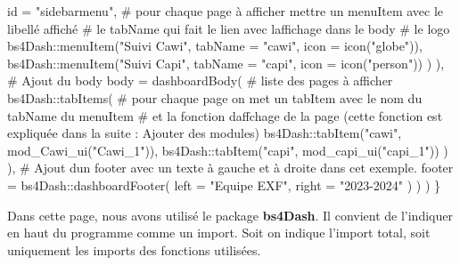 \documentclass[
  letterpaper,
  DIV=11,
  numbers=noendperiod]{scrreprt}
\newenvironment{Shaded}{\begin{snugshade}}{\end{snugshade}}
\newcommand{\AttributeTok}[1]{\textcolor[rgb]{0.40,0.45,0.13}{#1}}
\newcommand{\CommentTok}[1]{\textcolor[rgb]{0.37,0.37,0.37}{#1}}
\newcommand{\FunctionTok}[1]{\textcolor[rgb]{0.28,0.35,0.67}{#1}}
\newcommand{\NormalTok}[1]{\textcolor[rgb]{0.00,0.23,0.31}{#1}}
\newcommand{\SpecialCharTok}[1]{\textcolor[rgb]{0.37,0.37,0.37}{#1}}
\newcommand{\StringTok}[1]{\textcolor[rgb]{0.13,0.47,0.30}{#1}}
\begin{document}
\begin{Shaded}
\begin{Highlighting}[]
          \AttributeTok{id =} \StringTok{"sidebarmenu"}\NormalTok{,}
          \CommentTok{\# pour chaque page à afficher mettre un menuItem avec le libellé affiché}
          \CommentTok{\# le tabName qui fait le lien avec l\textquotesingle{}affichage dans le body}
          \CommentTok{\# le logo}
\NormalTok{          bs4Dash}\SpecialCharTok{::}\FunctionTok{menuItem}\NormalTok{(}\StringTok{"Suivi Cawi"}\NormalTok{, }\AttributeTok{tabName =} \StringTok{"cawi"}\NormalTok{, }\AttributeTok{icon =} \FunctionTok{icon}\NormalTok{(}\StringTok{"globe"}\NormalTok{)),}
\NormalTok{          bs4Dash}\SpecialCharTok{::}\FunctionTok{menuItem}\NormalTok{(}\StringTok{"Suivi Capi"}\NormalTok{, }\AttributeTok{tabName =} \StringTok{"capi"}\NormalTok{, }\AttributeTok{icon =} \FunctionTok{icon}\NormalTok{(}\StringTok{"person"}\NormalTok{))}
\NormalTok{        )}
\NormalTok{      ),}
      \CommentTok{\# Ajout du body}
      \AttributeTok{body =} \FunctionTok{dashboardBody}\NormalTok{(}
        \CommentTok{\# liste des pages à afficher}
\NormalTok{        bs4Dash}\SpecialCharTok{::}\FunctionTok{tabItems}\NormalTok{(}
          \CommentTok{\# pour chaque page on met un tabItem avec le nom du tabName du menuItem}
          \CommentTok{\# et la fonction d\textquotesingle{}affchage de la page (cette fonction est expliquée dans la suite : Ajouter des modules)}
\NormalTok{          bs4Dash}\SpecialCharTok{::}\FunctionTok{tabItem}\NormalTok{(}\StringTok{"cawi"}\NormalTok{, }\FunctionTok{mod\_Cawi\_ui}\NormalTok{(}\StringTok{"Cawi\_1"}\NormalTok{)),}
\NormalTok{          bs4Dash}\SpecialCharTok{::}\FunctionTok{tabItem}\NormalTok{(}\StringTok{"capi"}\NormalTok{, }\FunctionTok{mod\_capi\_ui}\NormalTok{(}\StringTok{"capi\_1"}\NormalTok{))}
\NormalTok{        )}
\NormalTok{      ),}
      \CommentTok{\# Ajout d\textquotesingle{}un footer avec un texte à gauche et à droite dans cet exemple.}
      \AttributeTok{footer =}\NormalTok{ bs4Dash}\SpecialCharTok{::}\FunctionTok{dashboardFooter}\NormalTok{(}
        \AttributeTok{left =} \StringTok{"Equipe EXF"}\NormalTok{,}
        \AttributeTok{right =} \StringTok{"2023{-}2024"}
\NormalTok{      )}
\NormalTok{    )}
\NormalTok{  )}
\NormalTok{\}}
\end{Highlighting}
\end{Shaded}

Dans cette page, nous avons utilisé le package \textbf{bs4Dash}. Il
convient de l'indiquer en haut du programme comme un import. Soit on
indique l'import total, soit uniquement les imports des fonctions
utilisées.
\end{document}
